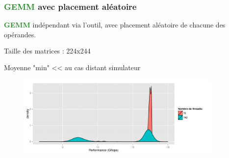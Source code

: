 \documentclass[xcolor={usenames,dvipsnames,svgnames,table}, aspectratio=43]{beamer}
\newcommand{\gemmcolor}[1]{\textcolor{ForestGreen}{\textbf{#1}}\xspace}
\newcommand{\gemm}{\gemmcolor{GEMM}}
\begin{document}
\begin{frame}
\frametitle{\gemm avec placement aléatoire}

\gemm indépendant via l'outil, avec placement aléatoire de chacune des opérandes.

Taille des matrices : 224x244

Moyenne "min" << au cas distant simulateur

\begin{figure}
  \centering
  \includegraphics[width=0.9\textwidth]{graph/distrib_random_tool.pdf}
\end{figure}

\end{frame}





\end{document}
